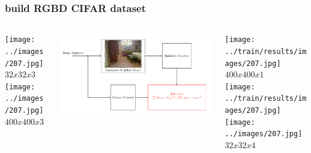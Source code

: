 \documentclass{beamer}
\begin{document}
\begin{frame}
\frametitle{build RGBD CIFAR dataset}
\begin{columns}
\begin{column}{.3\textwidth}
\texttt{[image: ../images/207.jpg]}\\
$32x32x3$
\texttt{[image: ../images/207.jpg]}\\
$400x400x3$
\end{column}

\begin{column}{.4\textwidth}
\includegraphics[width=\linewidth]{arch.png}

\end{column}
\begin{column}{.4\textwidth}
\texttt{[image: ../train/results/images/207.jpg]}\\
$400x400x1$\\
\texttt{[image: ../train/results/images/207.jpg]}
\texttt{[image: ../images/207.jpg]}\\
$32x32x4$
\end{column}
\end{columns}
\end{frame}
\end{document}
